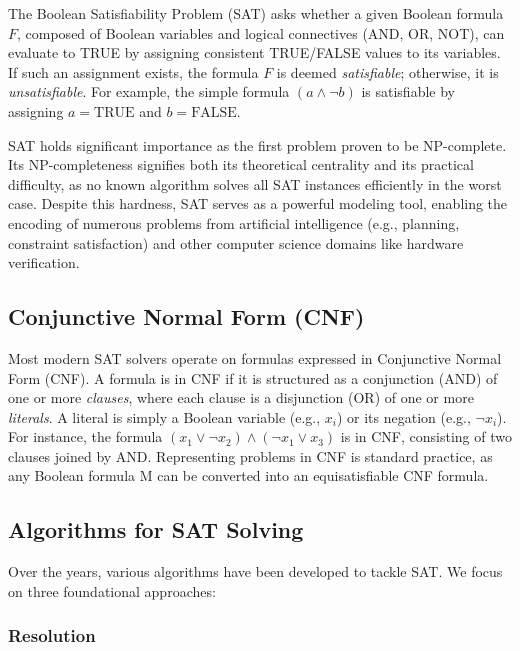 \documentclass[12pt, a4paper]{article}
\begin{document}
The Boolean Satisfiability Problem (SAT) asks whether a given Boolean formula $F$, composed of Boolean variables and logical connectives (AND, OR, NOT), can evaluate to TRUE by assigning consistent TRUE/FALSE values to its variables. If such an assignment exists, the formula $F$ is deemed \emph{satisfiable}; otherwise, it is \emph{unsatisfiable}. For example, the simple formula $(a \land \lnot b)$ is satisfiable by assigning $a=\text{TRUE}$ and $b=\text{FALSE}$.

SAT holds significant importance as the first problem proven to be NP-complete. Its NP-completeness signifies both its theoretical centrality and its practical difficulty, as no known algorithm solves all SAT instances efficiently in the worst case. Despite this hardness, SAT serves as a powerful modeling tool, enabling the encoding of numerous problems from artificial intelligence (e.g., planning, constraint satisfaction) and other computer science domains like hardware verification.

\subsection{Conjunctive Normal Form (CNF)}
\label{subsec:cnf}

Most modern SAT solvers operate on formulas expressed in Conjunctive Normal Form (CNF). A formula is in CNF if it is structured as a conjunction (AND) of one or more \emph{clauses}, where each clause is a disjunction (OR) of one or more \emph{literals}. A literal is simply a Boolean variable (e.g., $x_i$) or its negation (e.g., $\lnot x_i$). For instance, the formula $(x_1 \lor \lnot x_2) \land (\lnot x_1 \lor x_3)$ is in CNF, consisting of two clauses joined by AND. Representing problems in CNF is standard practice, as any Boolean formula M can be converted into an equisatisfiable CNF formula.

\subsection{Algorithms for SAT Solving}
\label{subsec:algorithms}

Over the years, various algorithms have been developed to tackle SAT. We focus on three foundational approaches:

\subsubsection{Resolution}
\label{subsubsec:resolution}
\end{document}
